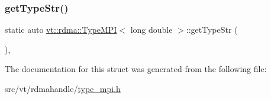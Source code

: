 \mbox{\label{structvt_1_1rdma_1_1_type_m_p_i_3_01long_01double_01_4_ab240e532ee53c92d71395de6d4622a08}} 
\subsubsection{\texorpdfstring{get\+Type\+Str()}{getTypeStr()}}
{\footnotesize\ttfamily static auto \hyperlink{structvt_1_1rdma_1_1_type_m_p_i}{vt\+::rdma\+::\+Type\+M\+PI}$<$ long double $>$\+::get\+Type\+Str (\begin{DoxyParamCaption}{ }\end{DoxyParamCaption})\hspace{0.3cm}{\ttfamily [inline]}, {\ttfamily [static]}}



The documentation for this struct was generated from the following file\+:\begin{DoxyCompactItemize}
\item 
src/vt/rdmahandle/\hyperlink{type__mpi_8h}{type\+\_\+mpi.\+h}\end{DoxyCompactItemize}

